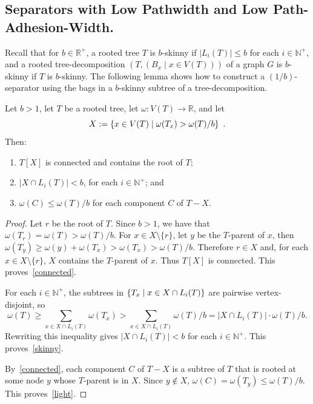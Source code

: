 \documentclass[twoside,leqno]{article}
\newcommand{\R}{\mathbb{R}}
\newcommand{\N}{\mathbb{N}}
\renewcommand{\ge}{\geqslant}
\renewcommand{\le}{\leqslant}
\DeclarePairedDelimiter{\set}{\{}{\}}
\begin{document}
\subsection{Separators with Low Pathwidth and Low Path-Adhesion-Width.}\label{lowpw}

Recall that for $b\in\R^+$, a rooted tree $T$ is $b$-skinny if $|L_i(T)|\le b$ for each $i\in\N^+$, and a rooted tree-decomposition $(T,(B_x\mid x\in V(T)))$ of a graph $G$ is $b$-skinny if $T$ is $b$-skinny.  The following lemma shows how to construct a $(1/b)$-separator using the bags in a $b$-skinny subtree of a tree-decomposition.

\begin{lem}\label{low_pathwidth_separator}
  Let $b>1$, let $T$ be a rooted tree, let $\omega:V(T)\to\R$, and let
  \[
    X:=\set{x\in V(T)\mid\omega(T_x)>\omega(T)/b} \enspace.
  \]
  Then:
  \begin{enumerate}[nosep,nolistsep,label=(\alph*)]
    \item\label{connected} $T[X]$ is connected and contains the root of $T$;
    \item\label{skinny} $|X\cap L_i(T)|< b$, for each $i\in\N^+$; and
    \item\label{light} $\omega(C)\le \omega(T)/b$ for each component $C$ of $T-X$.
  \end{enumerate}
\end{lem}

\begin{proof}
  Let $r$ be the root of $T$.  Since $b>1$, we have that $\omega(T_r)=\omega(T)>\omega(T)/b$. %
  For $x\in X\setminus\{r\}$, let $y$ be the $T$-parent of $x$, then
  $\omega(T_y)\ge \omega(y)+\omega(T_x)>\omega(T_x)>\omega(T)/b$.
  Therefore $r\in X$ and, for each $x\in X\setminus\{r\}$, $X$ contains the $T$-parent of $x$. Thus $T[X]$ is connected.
  This proves~\ref{connected}.

  For each $i\in\N^+$, the subtrees in $\set{T_x \mid x\in X\cap L_i(T)}$ are pairwise vertex-disjoint, so
  \[
    \omega(T) \ge \sum_{x\in X\cap L_i(T)} \omega(T_x)> \sum_{x\in X\cap L_i(T)}\omega(T)/b = |X\cap L_i(T)|\cdot\omega(T)/b.
  \]
  Rewriting this inequality gives $|X\cap L_i(T)|<b$ for each $i\in\N^+$.
  This proves~\ref{skinny}.

  By~\ref{connected}, each component $C$ of $T-X$ is a subtree of $T$ that is rooted at some node $y$ whose $T$-parent is in $X$.  Since  $y\not\in X$, $\omega(C)=\omega(T_y)\le \omega(T)/b$.
  This proves~\ref{light}.
\end{proof}
\end{document}
